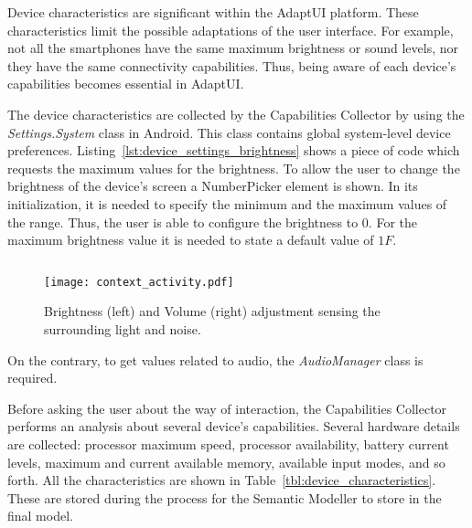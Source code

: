 Device characteristics are significant within the AdaptUI platform. These
characteristics limit the possible adaptations of the user interface. For example,
not all the smartphones have the same maximum brightness or sound levels, nor
they have the same connectivity capabilities. Thus, being aware of each device's
capabilities becomes essential in AdaptUI.

The device characteristics are collected by the Capabilities Collector by using
the \textit{Settings.System} class in Android. This class contains global
system-level device preferences. Listing~\ref{lst:device_settings_brightness} 
shows a piece of code which requests the maximum values for the brightness. To 
allow the user to change the brightness of the device's screen a NumberPicker 
element is shown. In its initialization, it is needed to specify the minimum and 
the maximum values of the range. Thus, the user is able to configure the brightness 
to $0$. For the maximum brightness value it is needed to state a default value 
of $1F$.

\inputminted[linenos=true, fontsize=\footnotesize, frame=lines]{java}{4_system_architecture/device_settings_brightness.java}


\begin{figure}[H]
\centering
\texttt{[image: context\_activity.pdf]}
\caption{Brightness (left) and Volume (right) adjustment sensing the surrounding
light and noise.}
\label{fig:context_activity}
\end{figure}


On the contrary, to get values related to audio, the \textit{AudioManager} class
is required. 
% 


Before asking the user about the way of interaction, the Capabilities Collector
performs an analysis about several device's capabilities. Several hardware
details are collected: processor maximum speed, processor availability, battery
current levels, maximum and current available memory, available input modes, 
and so forth. All the characteristics are shown in Table~\ref{tbl:device_characteristics}. 
These are stored during the process for the Semantic Modeller to store in the 
final model.

